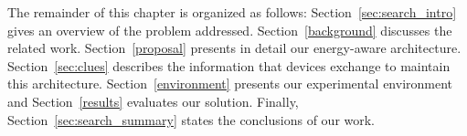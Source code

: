 


The remainder of this chapter is organized as follows:
Section~\ref{sec:search_intro} gives an overview of the problem addressed.
Section~\ref{background} discusses the related work.
Section~\ref{proposal} presents in detail our energy-aware architecture.
Section~\ref{sec:clues} describes the information that devices exchange to maintain this architecture.
Section~\ref{environment} presents our experimental environment and Section~\ref{results} evaluates our solution.
Finally, Section~\ref{sec:search_summary} states the conclusions of our work.













